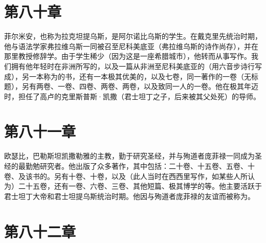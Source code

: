 
\section{第八十章}

菲尔米安，也称为拉克坦提乌斯，是阿尔诺比乌斯的学生。在戴克里先统治时期，他与语法学家弗拉维乌斯一同被召至尼科美底亚（弗拉维乌斯的诗作尚存），并在那里教授修辞学。由于学生稀少（因为这是一座希腊城市），他转而从事写作。我们拥有他年轻时在非洲所写的，以及一篇从非洲至尼科美底亚的（用六音步诗行写成），另一本称为的书，还有一本极其优美的，以及七卷，同一著作的一卷（无标题），另有两卷、一卷、四卷、两卷、两卷，以及致同一人的一卷。他在极其年迈时，担任了高卢的克里斯普斯·凯撒（君士坦丁之子，后来被其父处死）的导师。\par


\section{第八十一章}

欧瑟比，巴勒斯坦凯撒勒雅的主教，勤于研究圣经，并与殉道者庞菲禄一同成为圣经的最勤勉研究者。他出版了众多著作，其中包括：二十卷、十五卷、五卷、十卷、及该书的。另有十卷、十卷，以及（此人当时在西西里写作，如某些人所认为）二十五卷，还有一卷、六卷、三卷、其他短篇、极其博学的等。他主要活跃于君士坦丁大帝和君士坦提乌斯统治时期。他因与殉道者庞菲禄的友谊而被称为。\par


\section{第八十二章}

